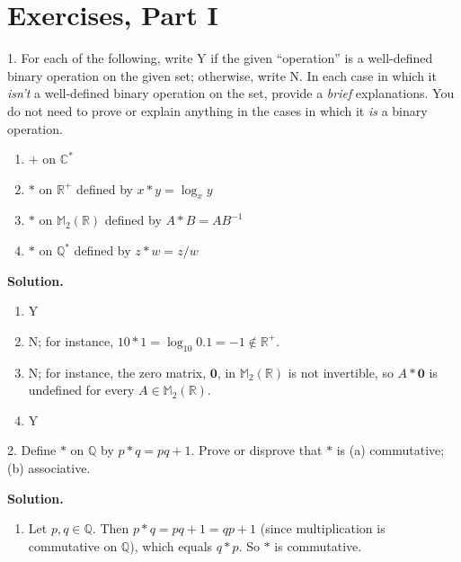 \documentclass[10pt,]{book}
\theoremstyle{plain}
\theoremstyle{definition}
\theoremstyle{definition}
\theoremstyle{definition}
\theoremstyle{definition}
\numberwithin{equation}{section}
\def\R{\mathbb{R}}
\def\Q{\mathbb{Q}}
\def\C{\mathbb{C}}
\def\M{\mathbb{M}}
\def\0{\mathbf 0}
\begin{document}
\section[{Exercises, Part I}]{Exercises, Part I}\label{exercises-2}
\begin{exerciselist}
\item[1.]\hypertarget{exercise-7}{}For each of the following, write Y if the given ``operation'' is a well-defined binary operation on the given set; otherwise, write N. In each case in which it \emph{isn't} a well-defined binary operation on the set, provide a \emph{brief} explanations. You do not need to prove or explain anything in the cases in which it \emph{is} a binary operation. \leavevmode%
\begin{enumerate}[label=(\alph*)]
\item\hypertarget{li-58}{}\(+\) on \(\C^*\)%
\item\hypertarget{li-59}{}\(*\) on \(\R^+\) defined by \(x*y=\log_x y\)%
\item\hypertarget{li-60}{}\(*\) on \(\M_2(\R)\) defined by \(A*B=AB^{-1}\)%
\item\hypertarget{li-61}{}\(*\) on \(\Q^*\) defined by \(z*w=z/w\)%
\end{enumerate}
%
\par\smallskip
\par\smallskip
\noindent\textbf{Solution.}\hypertarget{solution-7}{}\quad
\leavevmode%
\begin{enumerate}[label=(\alph*)]
\item\hypertarget{li-62}{}Y%
\item\hypertarget{li-63}{}N; for instance, \(10*1=\log_{10}0.1=-1\not\in\R^+\).%
\item\hypertarget{li-64}{}N; for instance, the zero matrix, \(\0\), in \(\M_2(\R)\) is not invertible, so \(A*\0\) is undefined for every \(A\in\M_2(\R)\).%
\item\hypertarget{li-65}{}Y%
\end{enumerate}
\item[2.]\hypertarget{exercise-8}{}Define \(*\) on \(\Q\) by \(p*q=pq+1\). Prove or disprove that \(*\) is (a) commutative; (b) associative.%
\par\smallskip
\par\smallskip
\noindent\textbf{Solution.}\hypertarget{solution-8}{}\quad
\leavevmode%
\begin{enumerate}[label=(\alph*)]
\item\hypertarget{li-66}{}Let \(p,q\in \Q\).  Then \(p*q=pq+1=qp+1\) (since multiplication is commutative on \(\Q\)), which equals \(q*p\).  So \(*\) is commutative.%

\end{enumerate}
\end{exerciselist}
\end{document}

